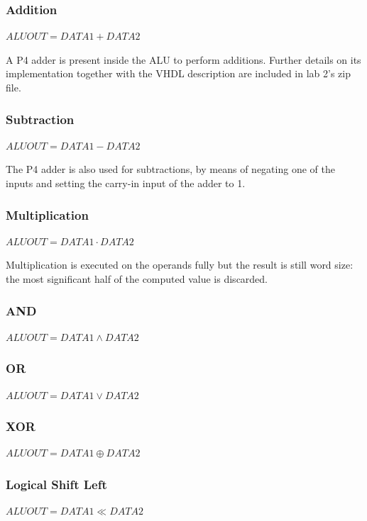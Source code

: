 \subsubsection{Addition}
$ \mathit{ALUOUT} = \mathit{DATA1} + \mathit{DATA2} $

A P4 adder is present inside the ALU to perform additions. Further details on its implementation together with the VHDL description are included in lab 2's zip file.

\subsubsection{Subtraction}
$ \mathit{ALUOUT} = \mathit{DATA1} - \mathit{DATA2} $


The P4 adder is also used for subtractions, by means of negating one of  the inputs and setting the carry-in input of the adder to 1.

\subsubsection{Multiplication}
$ \mathit{ALUOUT} = \mathit{DATA1} \cdot \mathit{DATA2} $


Multiplication is executed on the operands fully but the result is still word size: the most significant half of the computed value is discarded.

\subsubsection{AND}
$ \mathit{ALUOUT} = \mathit{DATA1} \wedge \mathit{DATA2} $

\subsubsection{OR}
$ \mathit{ALUOUT} = \mathit{DATA1} \lor \mathit{DATA2} $

\subsubsection{XOR}
$ \mathit{ALUOUT} = \mathit{DATA1} \oplus \mathit{DATA2} $

\subsubsection{Logical Shift Left}
$ \mathit{ALUOUT} = \mathit{DATA1} \ll \mathit{DATA2} $

